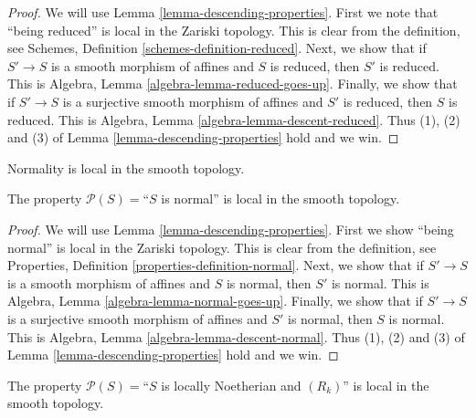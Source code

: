 \begin{proof}
We will use Lemma \ref{lemma-descending-properties}.
First we note that ``being reduced'' is local
in the Zariski topology. This is clear from the definition,
see Schemes, Definition \ref{schemes-definition-reduced}.
Next, we show that if $S' \to S$ is a smooth morphism of affines
and $S$ is reduced, then $S'$ is reduced. This is
Algebra, Lemma \ref{algebra-lemma-reduced-goes-up}.
Finally, we show that if $S' \to S$ is a surjective
smooth morphism of affines
and $S'$ is reduced, then $S$ is reduced. This is
Algebra, Lemma \ref{algebra-lemma-descent-reduced}.
Thus (1), (2) and (3) of Lemma \ref{lemma-descending-properties} hold
and we win.
\end{proof}

\begin{lemma}
\label{lemma-normal-local-smooth}
\begin{slogan}
Normality is local in the smooth topology.
\end{slogan}
The property $\mathcal{P}(S) =$``$S$ is normal'' is local in the smooth
topology.
\end{lemma}

\begin{proof}
We will use Lemma \ref{lemma-descending-properties}.
First we show ``being normal'' is local
in the Zariski topology. This is clear from the definition,
see Properties, Definition \ref{properties-definition-normal}.
Next, we show that if $S' \to S$ is a smooth morphism of affines
and $S$ is normal, then $S'$ is normal. This is
Algebra, Lemma \ref{algebra-lemma-normal-goes-up}.
Finally, we show that if $S' \to S$ is a surjective
smooth morphism of affines
and $S'$ is normal, then $S$ is normal. This is
Algebra, Lemma \ref{algebra-lemma-descent-normal}.
Thus (1), (2) and (3) of Lemma \ref{lemma-descending-properties} hold
and we win.
\end{proof}

\begin{lemma}
\label{lemma-Rk-local-smooth}
The property $\mathcal{P}(S) =$``$S$ is locally Noetherian and $(R_k)$''
is local in the smooth topology.
\end{lemma}

